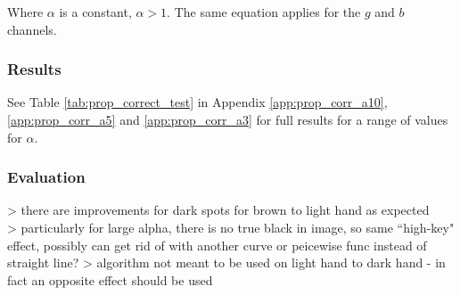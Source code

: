 Where $\alpha$ is a constant, $\alpha  > 1$. The same equation applies for the $g$ and $b$ channels.

\subsubsection*{Results}
See Table \ref{tab:prop_correct_test} in Appendix \ref{app:prop_corr_a10}, \ref{app:prop_corr_a5} and \ref{app:prop_corr_a3} for full results for a range of values for $\alpha$. %

\subsubsection*{Evaluation}
> there are improvements for dark spots for brown to light hand as expected\\
> particularly for large alpha, there is no true black in image, so same ``high-key" effect, possibly can get rid of with another curve or peicewise func instead of straight line?
> algorithm not meant to be used on light hand to dark hand - in fact an opposite effect should be used